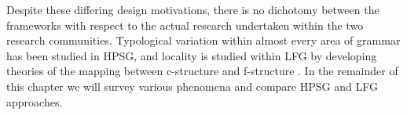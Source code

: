 
Despite these differing design motivations, there is no dichotomy between the frameworks with respect to the actual research undertaken within the two research communities.  Typological variation within almost every area of grammar has been studied in HPSG, and locality is studied within LFG by developing theories of the mapping between c-structure and f-structure  \citep[see][88-128]{BATW2016a}.   In the remainder of this chapter we will survey various phenomena and compare HPSG and LFG approaches.


